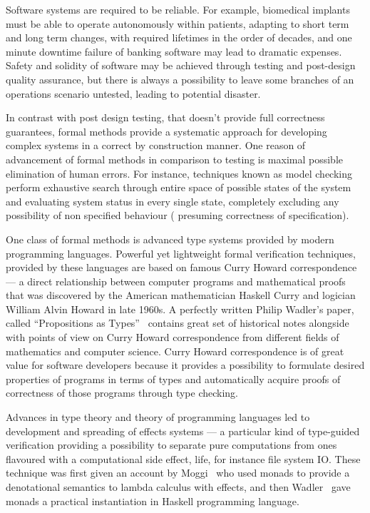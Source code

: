 \Intro

Software systems are required to be reliable. For example,
biomedical implants must be able to operate autonomously within patients,
adapting to short term and long term changes, with required lifetimes in the order of decades, and one minute downtime failure of banking software may lead to dramatic expenses. Safety and solidity of software may be achieved through testing and post-design quality assurance, but there is always a possibility to leave some branches of an operations scenario untested, leading to potential disaster.

In contrast with post design testing, that doesn’t provide full
correctness guarantees, formal methods provide a systematic approach for developing
complex systems in a correct by construction manner. One reason of advancement of
formal methods in comparison to testing is maximal possible elimination of human
errors. For instance, techniques known as model checking perform exhaustive search
through entire space of possible states of the system and evaluating system status in
every single state, completely excluding any possibility of non specified behaviour (
presuming correctness of specification).

One class of formal methods is advanced type systems provided by modern
programming languages. Powerful yet lightweight formal verification techniques,
provided by these languages are based on famous Curry Howard correspondence ---
a direct relationship between computer programs and mathematical
proofs that was discovered by the American mathematician Haskell Curry and logician
William Alvin Howard in late 1960s. A perfectly written Philip Wadler’s paper,
called ``Propositions as Types''~\cite{Wadler:2015:PT:2847579.2699407}
contains great set of historical notes alongside with points of view on
Curry Howard correspondence from different fields of
mathematics and computer science. Curry Howard correspondence is of great value
for software developers because it provides a possibility to formulate desired
properties of programs in terms of types and automatically acquire proofs of
correctness of those programs through type checking.

Advances in type theory and theory of programming languages led to development
and spreading of effects systems --- a particular kind of type-guided verification
providing a possibility to separate pure computations from ones flavoured with a
computational side effect, life, for instance file system IO. These technique
was first given an account by Moggi~\cite{Moggi:1991:NCM:116981.116984} who
used monads to provide a denotational semantics to lambda calculus with effects,
and then Wadler~\cite{Wadler:1992:EFP:143165.143169} gave monads a practical
instantiation in Haskell programming language.

